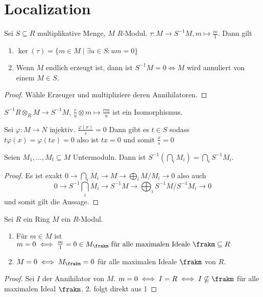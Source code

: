 \section{Localization}
\begin{Satz}
	Sei \(S\subseteq R\) multiplikative Menge, \(M\) \(R\)-Modul. \(\tau\colon M\to S^{-1}M, m\mapsto \frac m 1\). Dann gilt 
	\begin{enumerate}
		\item \(\ker(\tau)=\{m\in M\mid \exists u\in S\colon um=0\}\)
		\item Wenn \(M\) endlich erzeugt ist, dann ist \(S^{-1}M=0\iff M\) wird annuliert von einem \(M\in S\).
	\end{enumerate}
\end{Satz}
\begin{proof}
	Wähle Erzeuger und multipliziere deren Annihilatoren.
\end{proof}
\begin{Lemma}
	\(S^{-1}R\otimes_RM\to S^{-1}M,\, \frac r u\otimes m\mapsto \frac{rm}{u}\) ist ein Isomorphismus.
\end{Lemma}
\begin{Satz}\label{Satz:LokExakt}
	Sei \(\varphi\colon M\to N\) injektiv. \(\frac{\varphi(x)}{s}=0\) Dann gibt es \(t\in S\) sodass \(t\varphi(x)=\varphi(tx)=0\) also ist \(tx=0\) und somit \(\frac x s=0\)
	
\end{Satz}
\begin{Kor}
	Seien \(M_1,\dots,M_t\subseteq M\) Untermoduln. Dann ist \(S^{-1}(\bigcap_i M_i)=\bigcap_i S^{-1}M_i\).
\end{Kor}
\begin{proof}
	Es ist exakt \(0\to \bigcap_i M_i\to M\to \bigoplus_i M/M_i\to 0\) also auch 
	\[0\to S^{-1}\bigcap_i M_i\to S^{-1}M\to \bigoplus_i S^{-1}M/S^{-1}M_i\to 0\] und somit gilt die Aussage.
\end{proof}
\begin{Lemma}
	Sei \(R\) ein Ring \(M\) ein \(R\)-Modul.
	\begin{enumerate}
		\item Für \(m\in M\) ist \(m=0\iff \frac m 1=0\in M_\frakm \text{ für alle maximalen Ideale }\frakm\subseteq R\)
		\item \(M=0\iff M_\frakm=0\) für alle maximalen Ideale \(\frakm\) von \(R\).
	\end{enumerate}
\end{Lemma}
\begin{proof}
	Sei \(I\) der Annihilator von \(M\).
	\(m=0\iff I=R\iff I\not\subseteq \frakm\) für alle maximalen Ideal \(\frakm\).
	2. folgt direkt aus 1
\end{proof}

